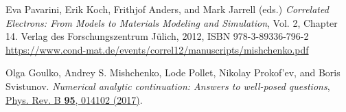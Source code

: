 \documentclass[]{article}
\begin{document}
\begin{thebibliography}{9}

Eva Pavarini, Erik Koch, Frithjof Anders, and Mark Jarrell (eds.)
{\it Correlated Electrons: From Models to Materials
Modeling and Simulation}, Vol. 2, Chapter 14.
Verlag des Forschungszentrum Jülich, 2012,
ISBN 978-3-89336-796-2
\url{https://www.cond-mat.de/events/correl12/manuscripts/mishchenko.pdf}

Olga Goulko, Andrey S. Mishchenko, Lode Pollet, Nikolay Prokof'ev, and Boris Svistunov.
{\it Numerical analytic continuation: Answers to well-posed questions},
\href{https://doi.org/10.1103/PhysRevB.95.014102}{Phys. Rev. B {\bf 95}, 014102 (2017)}.

\end{thebibliography}
\end{document}
